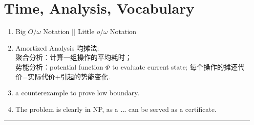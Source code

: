 \documentclass[10pt, a4paper, twocolumn]{article}
\begin{document}
\section{Time, Analysis, Vocabulary}
\begin{enumerate}[leftmargin = 12pt, topsep = 0pt, itemsep=0pt, partopsep = 0pt]
    \item Big $O$/$\omega$ Notation || Little $o$/$\omega$ Notation
    \item Amortized Analysis 均摊法:\\
        聚合分析：计算一组操作的平均耗时；\\
        势能分析：potential function $\Phi$ to evaluate current state; 每个操作的摊还代价=实际代价+引起的势能变化.
    \item a counterexample to prove low boundary.
    \item The problem is clearly in NP, as a $\dots$ can be served as a certificate. 
\end{enumerate}
\vspace{0.1cm}
\hrule
\end{document}
